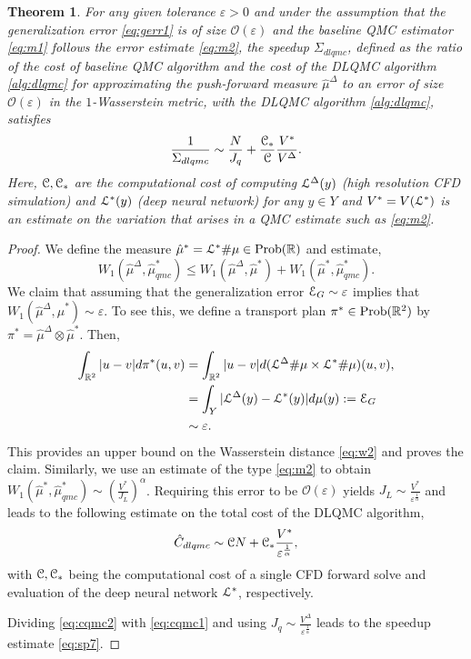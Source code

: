 \documentclass[a4paper]{article}
\numberwithin{equation}{section}
\newtheorem{theorem}{Theorem}[section]
\numberwithin{equation}{section}
\theoremstyle{definition}
\theoremstyle{myremarkstyle}
\renewcommand{\leq}{\leqslant}
\renewcommand{\epsilon}{\varepsilon}
\newcommand{\R}{\mathbb{R}}
\newcommand{\cO}{{\mathcal O}}
\newcommand{\map}{\EuScript{L}}
\newcommand{\er}{\EuScript{E}}
\newcommand{\cost}{\EuScript{C}}
\begin{document}
\begin{theorem}
\label{thrm:4}
For any given tolerance $\epsilon > 0$ and under the assumption that the generalization error \eqref{eq:gerr1} is of size $\cO(\epsilon)$ and the baseline QMC estimator \eqref{eq:m1} follows the error estimate \eqref{eq:m2}, the speedup $\Sigma_{dlqmc}$, defined as the ratio of the cost of baseline QMC algorithm and the cost of the DLQMC algorithm \ref{alg:dlqmc} for approximating the push-forward measure $\hat{\mu}^{\Delta}$ to an error of size ${\mathcal O} (\epsilon)$ in the $1$-Wasserstein metric, with the DLQMC algorithm \ref{alg:dlqmc}, satisfies
\begin{equation}
\label{eq:sp7}
\frac{1}{\Sigma_{dlqmc}} \sim \frac{N}{J_q} +\frac{\cost_{\ast}}{\cost} \frac{V^{\ast}}{V^{\Delta}}.
\end{equation}
Here, $\cost, \cost_{\ast}$ are the computational cost of computing $\map^{\Delta}(y)$ (high resolution CFD simulation) and $\map^{\ast}(y)$ (deep neural network) for any $y \in Y$ and $V^{\ast} = V(\map^{\ast})$ is an estimate on the variation that arises in a QMC estimate such as \eqref{eq:m2}. 
\end{theorem}
\begin{proof}
We define the measure $\hat{\mu}^{\ast} = \map^{\ast}\# \mu \in {\rm Prob}(\R)$ and estimate,
$$
W_1\left(\hat{\mu}^{\Delta},\hat{\mu}^{\ast}_{qmc} \right) \leq W_1\left(\hat{\mu}^{\Delta},\hat{\mu}^{\ast} \right) + W_1\left(\hat{\mu}^{\ast},\hat{\mu}^{\ast}_{qmc} \right).
$$
We claim that assuming that the generalization error $\er_G \sim \epsilon$ implies that $W_1\left(\hat{\mu}^{\Delta},\hat{\mu}^{\ast} \right) \sim \epsilon$.  To see this, we define a transport plan $\pi^{\ast} \in {\rm Prob}(\R^2)$ by $\pi^{\ast} = \hat{\mu}^{\Delta} \otimes \hat{\mu}^{\ast}$. Then, 
\begin{align*}
\int_{\R^2} |u-v| d\pi^{\ast}(u,v) &= \int_{\R^2} |u-v| d(\map^{\Delta}\#\mu \times \map^{\ast}\#\mu)(u,v), \\
&= \int_{Y} |\map^{\Delta}(y) - \map^{\ast}(y)| d\mu(y) := \er_G \\
&\sim \epsilon.
\end{align*} 
This provides an upper bound on the Wasserstein distance \eqref{eq:w2} and proves the claim.  Similarly, we use an estimate of the type \eqref{eq:m2} to obtain $W_1\left(\hat{\mu}^{\ast},\hat{\mu}^{\ast}_{qmc} \right) \sim \left(\frac{V^{\ast}}{J_L}\right)^{\alpha}$. Requiring this error to be $\cO(\epsilon)$ yields $J_L \sim \frac{V^{\ast}}{\epsilon^{\frac{1}{\alpha}}}$ and leads to the following estimate on the total cost of the DLQMC algorithm,
\begin{equation}
\label{eq:cqmc2}
\hat{C}_{dlqmc} \sim \cost N + \cost_{\ast} \frac{V^{\ast}}{\epsilon^{\frac{1}{\alpha}}},
\end{equation}
with $\cost,\cost_{\ast}$ being the computational cost of a single CFD forward solve and evaluation of the deep neural network $\map^{\ast}$, respectively.  

Dividing \eqref{eq:cqmc2} with \eqref{eq:cqmc1} and using $J_q \sim \frac{V^{\Delta}}{\epsilon^{\frac{1}{\alpha}}}$ leads to the speedup estimate \eqref{eq:sp7}. 


\end{proof}
\end{document}
